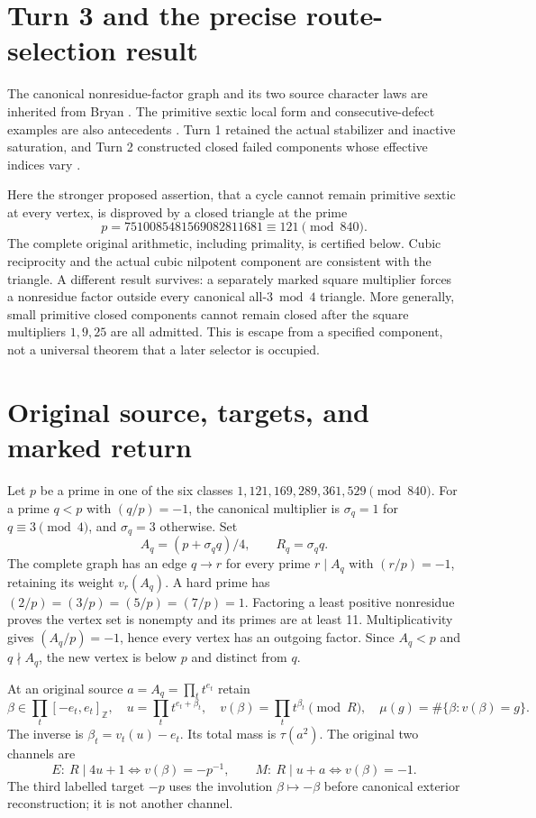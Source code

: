 \section{Turn 3 and the precise route-selection result}
The canonical nonresidue-factor graph and its two source character laws are
inherited from Bryan \cite[\S\S1--7]{BryanGraph}. The primitive sextic local form
and consecutive-defect examples are also antecedents
\cite[\S\S3--8]{BryanSix}\cite[\S\S2--5]{BryanChain}. Turn 1 retained the actual
stabilizer and inactive saturation, and Turn 2 constructed closed failed components
whose effective indices vary \cite{Turn1,Turn2}.

Here the stronger proposed assertion, that a cycle cannot remain primitive sextic
at every vertex, is disproved by a closed triangle at the prime
\[
 \boxed{p=7510085481569082811681\equiv121\pmod{840}.}       \tag{1}
\]
The complete original arithmetic, including primality, is certified below.
Cubic reciprocity and the actual cubic nilpotent component are consistent with the
triangle. A different result survives: a separately marked square multiplier
forces a nonresidue factor outside every canonical all-$3\bmod4$ triangle.
More generally, small primitive closed components cannot remain closed after the
square multipliers $1,9,25$ are all admitted. This is escape from a specified
component, not a universal theorem that a later selector is occupied.

\section{Original source, targets, and marked return}
Let $p$ be a prime in one of the six classes $1,121,169,289,361,529\pmod{840}$.
For a prime $q<p$ with $(q/p)=-1$, the canonical multiplier is
$\sigma_q=1$ for $q\equiv3\pmod4$, and $\sigma_q=3$ otherwise. Set
\[
 A_q=(p+\sigma_q q)/4,\qquad R_q=\sigma_q q.
\]
The complete graph has an edge $q\to r$ for every prime $r\mid A_q$ with
$(r/p)=-1$, retaining its weight $v_r(A_q)$. A hard prime has
$(2/p)=(3/p)=(5/p)=(7/p)=1$. Factoring a least positive nonresidue proves the
vertex set is nonempty and its primes are at least 11. Multiplicativity gives
$(A_q/p)=-1$, hence every vertex has an outgoing factor. Since $A_q<p$ and
$q\nmid A_q$, the new vertex is below $p$ and distinct from $q$.

At an original source $a=A_q=\prod_t t^{e_t}$ retain
\[
 \beta\in\prod_t[-e_t,e_t]_{\mathbb Z},\quad
 u=\prod_t t^{e_t+\beta_t},\quad
 v(\beta)=\prod_t t^{\beta_t}\pmod R,\quad
 \mu(g)=\#\{\beta:v(\beta)=g\}.                         \tag{2}
\]
The inverse is $\beta_t=v_t(u)-e_t$. Its total mass is $\tau(a^2)$.
The original two channels are
\[
 E:\ R\mid4u+1\iff v(\beta)=-p^{-1},\qquad
 M:\ R\mid u+a\iff v(\beta)=-1.                         \tag{3}
\]
The third labelled target $-p$ uses the involution $\beta\mapsto-\beta$ before
canonical exterior reconstruction; it is not another channel.

